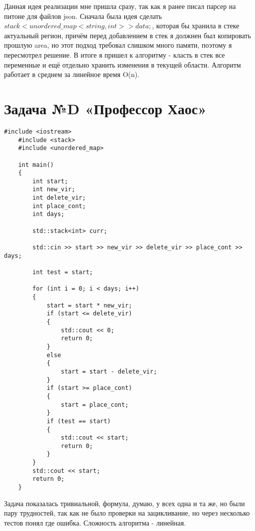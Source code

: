 \documentclass{article}
\begin{document}
Данная идея реализации мне пришла сразу, так как я ранее писал парсер на питоне для файлов json. 
Сначала была идея сделать $stack<unordered\_map< string, int > > data;$, которая бы хранила в стеке актуальный регион, причём перед добавлением в стек я должнен был копировать прошлую area, но этот подход требовал слишком много памяти, поэтому я пересмотрел решение.
В итоге я пришел к алгоритму - класть в стек все переменные и ещё отдельно хранить изменения в текущей области. Алгоритм работает в среднем за линейное время O(n).
\section{Задача №D «Профессор Хаос»}
\begin{lstlisting}[frame=single, basicstyle=\ttfamily, breaklines=true, breakatwhitespace=true, postbreak=\mbox{\textcolor{red}{$\hookrightarrow$}\space}]
    #include <iostream>
    #include <stack>
    #include <unordered_map>
    
    int main()
    {
        int start;
        int new_vir;
        int delete_vir;
        int place_cont;
        int days;
    
        std::stack<int> curr;
    
        std::cin >> start >> new_vir >> delete_vir >> place_cont >> days;
    
        int test = start;
    
        for (int i = 0; i < days; i++)
        {
            start = start * new_vir;
            if (start <= delete_vir)
            {
                std::cout << 0;
                return 0;
            }
            else
            {
                start = start - delete_vir;
            }
            if (start >= place_cont)
            {
                start = place_cont;
            }
            if (test == start)
            {
                std::cout << start;
                return 0;
            }
        }
        std::cout << start;
        return 0;
    }
\end{lstlisting}
Задача показалась тривиальной, формула, думаю, у всех одна и та же, но были пару трудностей, так как не было проверки на зацикливание, но через несколько тестов понял где ошибка. Сложность алгоритма - линейная.
\end{document}
